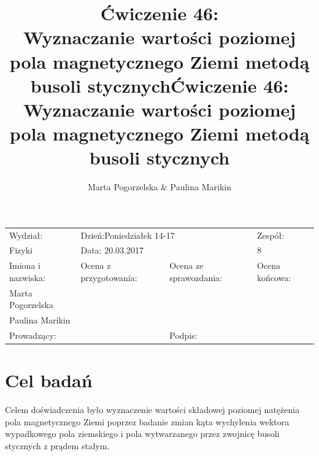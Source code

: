 \documentclass[a4paper,10pt]{article}
\def\arraystretch{1.2}
\begin{document}
\begin{table}
  \centering
  \def\arraystretch{1.5}
    \begin{tabular}{|l|l|l|l|} \hline
    Wydział:           & \multicolumn{2}{l|}{Dzień:Poniedziałek 14-17}    &Zespół:  \\
    Fizyki             &    \multicolumn{2}{l|}{Data: 20.03.2017}         &8             \\\hline
    Imiona i nazwiska: &Ocena z przygotowania:  &Ocena ze sprawozdania:   &Ocena końcowa: \\
    Marta Pogorzelska  &                        &                         &                \\
    Paulina Marikin    &                        &                         &\\\hline
    \multicolumn{2}{|l|}{Prowadzący:                 } &\multicolumn{2}{l|}{Podpis:             }  \\\hline
  \end{tabular}
\end{table}


\title{Ćwiczenie 46:\\Wyznaczanie wartości poziomej pola magnetycznego Ziemi metodą busoli stycznych}
\date{}
\author{Marta Pogorzelska \& Paulina Marikin}
\maketitle{}

\title{Ćwiczenie 46:\\Wyznaczanie wartości poziomej pola magnetycznego Ziemi metodą busoli stycznych}
\date{}
\maketitle{}

\section{Cel badań}
Celem doświadczenia było wyznaczenie wartości składowej poziomej natężenia pola magnetycznego Ziemi poprzez badanie zmian kąta wychylenia wektora wypadkowego pola ziemskiego i pola wytwarzanego przez zwojnicę busoli stycznych z prądem stałym.
\end{document}
